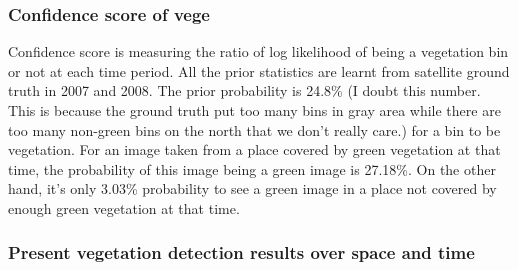 
\subsubsection*{Confidence score of vege}
Confidence score is
measuring the ratio of log likelihood of being a vegetation bin or not at each time period. All the prior statistics are learnt from satellite ground truth in 2007 and 2008.
The prior probability is 24.8\% (I doubt this number. This is because the ground truth put too many bins in gray area while there are too many non-green bins on the north that we don't really care.) for a bin to be vegetation.
For an image taken from a place covered by green vegetation at that time, the probability of this image being a green image is 27.18\%. On the other hand, it's only 3.03\% probability to see a green image in a place not covered by enough green vegetation at that time.



\subsubsection*{Present vegetation detection results over space and time}

